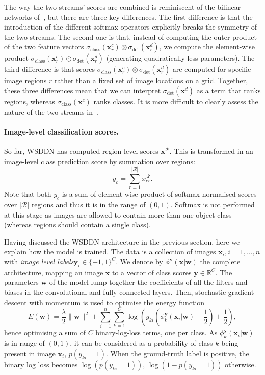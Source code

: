 \documentclass[10pt,twocolumn,letterpaper]{article}
\newcommand{\bx}{\mathbf{x}}
\newcommand{\by}{\mathbf{y}}
\newcommand{\bw}{\mathbf{w}}
\begin{document}
The way the two streams' scores are combined is reminiscent of the bilinear networks of~\cite{Lin15}, but there are three key differences. The first difference is that the introduction of the different softmax operators explicitly breaks the symmetry of the two streams. The second one is that, instead of computing the outer product of the two feature vectors $\sigma_\text{class}(\bx^c_r) \otimes \sigma_\text{det}(\bx^d_r)$, we compute the element-wise product $\sigma_\text{class}(\bx^c_r) \odot \sigma_\text{det}(\bx^d_r)$ (generating quadratically less parameters). The third difference is that scores $\sigma_\text{class}(\bx^c_r) \otimes \sigma_\text{det}(\bx^d_r)$ are computed for specific image regions $r$ rather than a fixed set of image locations on a grid. Together, these three differences mean that we can interpret $\sigma_\text{det}(\bx^d)$ as a term that ranks regions, whereas $\sigma_\text{class}(\bx^c)$ ranks classes. It is more difficult to clearly assess the nature of the two streams in~\cite{Lin15}.

\paragraph{Image-level classification scores.} So far, WSDDN has computed region-level scores $\bx^\mathcal{R}$. This is transformed in an image-level class prediction score by summation over regions:
\[
   y_c = \sum_{r=1}^{|\mathcal{R}|} x^{\mathcal{R}}_{cr}.
\] 
Note that both $y_c$ is a sum of element-wise product of softmax normalised scores over $|\mathcal{R}|$ regions and thus it is in the range of $(0,1)$. Softmax is not performed at this stage as images are allowed to contain more than one object class (whereas regions should contain a single class).


Having discussed the WSDDN architecture in the previous section, here we explain how the model is trained. The data is a collection of images $\bx_i, i=1,\dots, n$ with \emph{image level labels}$\by_i \in \{-1,1\}^C$. We denote by $\phi^{\by}(\bx|\bw)$ the complete architecture, mapping an image $\bx$ to a vector of class scores $\by\in\mathbb{R}^C$. The parameters $\bw$ of the model lump together the coefficients of all the filters and biases in the convolutional and fully-connected layers. Then, stochastic gradient descent with momentum is used to optimise the energy function
\begin{equation}
E(\bw)
=
\frac{\lambda}{2}\|\bw\|^2
+
\sum_{i=1}^n
\sum_{k=1}^C
\log(y_{ki} (\phi^{\by}_k(\bx_i|\bw)-\frac{1}{2}) + \frac{1}{2}),
\label{eq:energy}
\end{equation} hence optimising a sum of $C$ binary-log-loss terms, one per class. As $\phi^{\by}_k(\bx_i|\bw)$ is in range of $(0,1)$, it can be considered as a probability of class $k$ being present in image $\bx_i$, \ie$p(y_{ki}=1)$. When the ground-truth label is positive, the binary log loss becomes $\log(p(y_{ki}=1))$, $\log(1-p(y_{ki}=1))$ otherwise.
\end{document}
